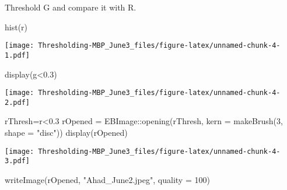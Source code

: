 \documentclass[
]{article}
\newenvironment{Shaded}{\begin{snugshade}}{\end{snugshade}}
\newcommand{\AttributeTok}[1]{\textcolor[rgb]{0.77,0.63,0.00}{#1}}
\newcommand{\DecValTok}[1]{\textcolor[rgb]{0.00,0.00,0.81}{#1}}
\newcommand{\FloatTok}[1]{\textcolor[rgb]{0.00,0.00,0.81}{#1}}
\newcommand{\FunctionTok}[1]{\textcolor[rgb]{0.00,0.00,0.00}{#1}}
\newcommand{\NormalTok}[1]{#1}
\newcommand{\OtherTok}[1]{\textcolor[rgb]{0.56,0.35,0.01}{#1}}
\newcommand{\SpecialCharTok}[1]{\textcolor[rgb]{0.00,0.00,0.00}{#1}}
\newcommand{\StringTok}[1]{\textcolor[rgb]{0.31,0.60,0.02}{#1}}
\begin{document}
Threshold G and compare it with R.

\begin{Shaded}
\begin{Highlighting}[]
\FunctionTok{hist}\NormalTok{(r)}
\end{Highlighting}
\end{Shaded}

\texttt{[image: Thresholding-MBP\_June3\_files/figure-latex/unnamed-chunk-4-1.pdf]}

\begin{Shaded}
\begin{Highlighting}[]
\FunctionTok{display}\NormalTok{(g}\SpecialCharTok{\textless{}}\FloatTok{0.3}\NormalTok{)}
\end{Highlighting}
\end{Shaded}

\texttt{[image: Thresholding-MBP\_June3\_files/figure-latex/unnamed-chunk-4-2.pdf]}

\begin{Shaded}
\begin{Highlighting}[]
\NormalTok{rThresh}\OtherTok{=}\NormalTok{r}\SpecialCharTok{\textless{}}\FloatTok{0.3}
\NormalTok{rOpened }\OtherTok{=}\NormalTok{ EBImage}\SpecialCharTok{::}\FunctionTok{opening}\NormalTok{(rThresh,}
                            \AttributeTok{kern =} \FunctionTok{makeBrush}\NormalTok{(}\DecValTok{3}\NormalTok{, }\AttributeTok{shape =} \StringTok{"disc"}\NormalTok{))}
\FunctionTok{display}\NormalTok{(rOpened)}
\end{Highlighting}
\end{Shaded}

\texttt{[image: Thresholding-MBP\_June3\_files/figure-latex/unnamed-chunk-4-3.pdf]}

\begin{Shaded}
\begin{Highlighting}[]
\FunctionTok{writeImage}\NormalTok{(rOpened, }\StringTok{"Ahad\_June2.jpeg"}\NormalTok{, }\AttributeTok{quality =} \DecValTok{100}\NormalTok{)}
\end{Highlighting}
\end{Shaded}
\end{document}

